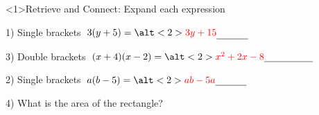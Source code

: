 \documentclass{beamer}
\newcommand{\ablank}[1]{%
  \alt<2>{\textcolor{red}{#1}}{\underline{\phantom{#1}}}%
}
\newcommand{\ashow}[1]{\uncover<2->{\textcolor{red}{\small #1}}}
\newcommand{\ashowq}[1]{\alt<2->{\textcolor{red}{\small #1}}{?}}
\begin{document}
\begin{frame}<1>{Retrieve and Connect: Expand each expression}
\begin{minipage}[t]{0.48\textwidth}
  \begin{block}{1) Single brackets}
    \Large \(\;3(y+5)=\ablank{3y+15}\)
  \end{block}
  \vspace{0.5em}
  \begin{block}{3) Double brackets}
    \Large \(\;(x+4)(x-2)=\ablank{x^2+2x-8}\)
  \end{block}
\end{minipage}\hfill
\begin{minipage}[t]{0.48\textwidth}
  \begin{block}{2) Single brackets}
    \Large \(\; a(b-5)=\ablank{ab-5a}\)
  \end{block}
  \vspace{0.5em}
  \begin{block}{4) What is the area of the rectangle?}
    \par\vspace{0.5em}
    \ashow{Area = \(x(f+6)\)}
  \end{block}
\end{minipage}
\end{frame}
\end{document}
